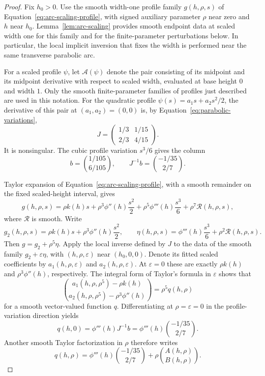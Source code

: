 \begin{proof}
Fix $h_0>0$. Use the smooth width-one profile family
$g(h,\rho,s)$ of Equation~\eqref{eq:arc-scaling-profile}, with signed
auxiliary parameter $\rho$ near zero and $h$ near $h_0$.
Lemma~\ref{lem:arc-scaling} provides smooth endpoint data at scaled
width one for this family and for the finite-parameter perturbations
below. In particular, the local implicit inversion that fixes the
width is performed near the same transverse parabolic arc.

For a scaled profile $\psi$, let $\mathcal A(\psi)$ denote the pair
consisting of its midpoint and its midpoint derivative with respect
to scaled width, evaluated at base height $0$ and width $1$.  Only the
smooth finite-parameter families of profiles just described are used
in this notation.  For the quadratic profile
$\psi(s)=a_1s+a_2s^2/2$, the derivative of this pair at $(a_1,a_2)=(0,0)$
is, by Equation~\eqref{eq:parabolic-variations},
\[
 J=\begin{pmatrix}
       1/3&1/15\\
       2/3&4/15
    \end{pmatrix}.
\]
It is nonsingular.  The cubic profile variation $s^3/6$ gives the
column
\[
 b=\binom{1/105}{6/105},\qquad
 J^{-1}b=\binom{-1/35}{2/7}.
\]

Taylor expansion of Equation~\eqref{eq:arc-scaling-profile}, with a
smooth remainder on the fixed scaled-height interval, gives
\begin{equation}\label{eq:fit-scaled-taylor}
 g(h,\rho,s)
 =\rho k(h)s+\rho^3\phi''(h)\frac{s^2}{2}
   +\rho^5\phi'''(h)\frac{s^3}{6}
   +\rho^7\mathcal R(h,\rho,s),
\end{equation}
where $\mathcal R$ is smooth.  Write
\[
 g_2(h,\rho,s)=\rho k(h)s+\rho^3\phi''(h)\frac{s^2}{2},
 \qquad
 \eta(h,\rho,s)=\phi'''(h)\frac{s^3}{6}
                    +\rho^2\mathcal R(h,\rho,s).
\]
Then $g=g_2+\rho^5\eta$.  Apply the local inverse defined by $J$ to
the data of the smooth family $g_2+\varepsilon\eta$, with
$(h,\rho,\varepsilon)$ near $(h_0,0,0)$.  Denote its fitted scaled
coefficients by $a_1(h,\rho,\varepsilon)$ and
$a_2(h,\rho,\varepsilon)$.  At $\varepsilon=0$ these are exactly
$\rho k(h)$ and $\rho^3\phi''(h)$, respectively.  The integral form of
Taylor's formula in $\varepsilon$ shows that
\[
 \binom{a_1(h,\rho,\rho^5)-\rho k(h)}
       {a_2(h,\rho,\rho^5)-\rho^3\phi''(h)}
   =\rho^5 q(h,\rho)
\]
for a smooth vector-valued function $q$.  Differentiating at
$\rho=\varepsilon=0$ in the profile-variation direction yields
\[
 q(h,0)=\phi'''(h)J^{-1}b
       =\phi'''(h)\binom{-1/35}{2/7}.
\]
Another smooth Taylor factorization in $\rho$ therefore writes
\[
 q(h,\rho)=\phi'''(h)\binom{-1/35}{2/7}
                    +\rho\binom{A(h,\rho)}{B(h,\rho)}.
\]


\end{proof}
